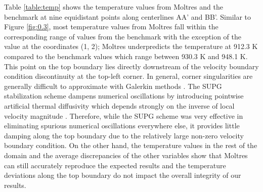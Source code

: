 Table \ref{table:temp} shows the temperature values from Moltres and the
benchmark at nine equidistant points along centerlines AA' and BB'. Similar to
Figure \ref{fig:0.3}, most temperature values from Moltres fall within the
corresponding range of values from the benchmark with the exception of the
value at the coordinates (1, 2); Moltres underpredicts the temperature at 912.3
K compared to the benchmark values which range between 930.3 K
and 948.1 K. This point on the top boundary lies directly
downstream of
the velocity boundary condition discontinuity at the top-left corner.
In general, corner singularities are generally difficult to approximate with
Galerkin methods \citep{kuhlmann_lid-driven_2018}.
The \gls{SUPG} stabilization scheme dampens numerical oscillations by
introducing pointwise artificial thermal diffusivity which depends strongly on
the inverse of local velocity magnitude \citep{peterson_overview_2018}.
Therefore, while the \gls{SUPG} scheme was very effective in eliminating
spurious numerical oscillations everywhere else, it provides little damping
along the top boundary due to the relatively large non-zero velocity boundary
condition. On the other hand, the temperature values in the rest of the domain
and the average discrepancies of the other variables show that Moltres can
still accurately reproduce the expected results and the temperature deviations
along the top boundary do not impact the overall integrity of our results.

